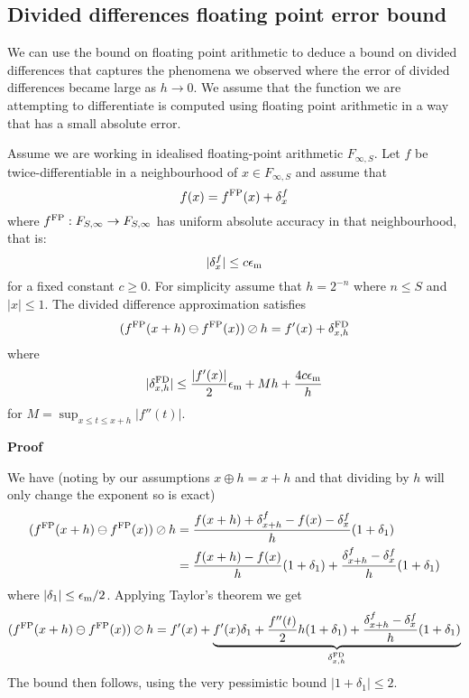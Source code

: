 \subsection{Divided differences floating point error bound}
We can use the bound on floating point arithmetic to deduce a bound on divided differences that captures the phenomena we observed where the error of divided differences became large as $h \ensuremath{\rightarrow} 0$. We assume that the function we are attempting to differentiate is computed using floating point arithmetic in a way that has a small absolute error.

\begin{theorem} Assume we are working in idealised floating-point arithmetic $F_{\ensuremath{\infty},S}$. Let $f$ be twice-differentiable in a neighbourhood of $x \ensuremath{\in} F_{\ensuremath{\infty},S}$ and assume that
\[
 f(x) = f^{\rm FP}(x) + \ensuremath{\delta}_x^f
\]
where $f^{\rm FP} : F_{S,\ensuremath{\infty}} \ensuremath{\rightarrow} F_{S,\ensuremath{\infty}}$ has uniform absolute accuracy in that neighbourhood, that is:
\[
|\ensuremath{\delta}_x^f| \ensuremath{\leq} c \ensuremath{\epsilon}_{\rm m}
\]
for a fixed constant $c \ensuremath{\geq} 0$. For simplicity assume that $h = 2^{-n}$ where $n \ensuremath{\leq} S$ and $|x| \ensuremath{\leq} 1$. The divided difference approximation satisfies
\[
(f^{\rm FP}(x + h) \ensuremath{\ominus} f^{\rm FP}(x)) \ensuremath{\oslash} h = f'(x) + \ensuremath{\delta}_{x,h}^{\rm FD}
\]
where
\[
|\ensuremath{\delta}_{x,h}^{\rm FD}| \ensuremath{\leq} {|f'(x)| \over 2} \ensuremath{\epsilon}_{\rm m} + M h +  {4c \ensuremath{\epsilon}_{\rm m} \over h}
\]
for $M = \sup_{x \ensuremath{\leq} t \ensuremath{\leq} x+h} |f''(t)|$.

\end{theorem}
\textbf{Proof}

We have (noting by our assumptions $x \ensuremath{\oplus} h = x + h$ and that dividing by $h$ will only change the exponent so is exact)
\begin{align*}
(f^{\rm FP}(x + h) \ensuremath{\ominus} f^{\rm FP}(x)) \ensuremath{\oslash} h &= {f(x + h) +  \ensuremath{\delta}^f_{x+h} - f(x) - \ensuremath{\delta}^f_x \over h} (1 + \ensuremath{\delta}_1) \\
&= {f(x+h) - f(x) \over h} (1 + \ensuremath{\delta}_1) + {\ensuremath{\delta}^f_{x+h}- \ensuremath{\delta}^f_x \over h} (1 + \ensuremath{\delta}_1)
\end{align*}
where $|\ensuremath{\delta}_1| \ensuremath{\leq} {\ensuremath{\epsilon}_{\rm m} / 2}$. Applying Taylor's theorem we get
\[
(f^{\rm FP}(x + h) \ensuremath{\ominus} f^{\rm FP}(x)) \ensuremath{\oslash} h = f'(x) + \underbrace{f'(x) \ensuremath{\delta}_1 + {f''(t) \over 2} h (1 + \delta_1) + {\ensuremath{\delta}^f_{x+h}- \ensuremath{\delta}^f_x \over h} (1 + \ensuremath{\delta}_1)}_{\ensuremath{\delta}_{x,h}^{\rm FD}}
\]
The bound then follows, using the very pessimistic bound $|1 + \ensuremath{\delta}_1| \ensuremath{\leq} 2$.

